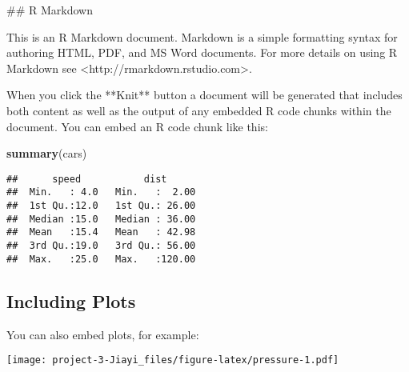 \documentclass[
]{article}
\newenvironment{Shaded}{\begin{snugshade}}{\end{snugshade}}
\newcommand{\FunctionTok}[1]{\textcolor[rgb]{0.13,0.29,0.53}{\textbf{#1}}}
\newcommand{\NormalTok}[1]{#1}
\begin{document}
\begin{Shaded}
\begin{Highlighting}[]
\NormalTok{\#\# R Markdown}

\NormalTok{This is an R Markdown document. Markdown is a simple formatting syntax for authoring HTML, PDF, and MS Word documents. For more details on using R Markdown see \textless{}http://rmarkdown.rstudio.com\textgreater{}.}

\NormalTok{When you click the **Knit** button a document will be generated that includes both content as well as the output of any embedded R code chunks within the document. You can embed an R code chunk like this:}
\end{Highlighting}
\end{Shaded}

\begin{Shaded}
\begin{Highlighting}[]
\FunctionTok{summary}\NormalTok{(cars)}
\end{Highlighting}
\end{Shaded}

\begin{verbatim}
##      speed           dist       
##  Min.   : 4.0   Min.   :  2.00  
##  1st Qu.:12.0   1st Qu.: 26.00  
##  Median :15.0   Median : 36.00  
##  Mean   :15.4   Mean   : 42.98  
##  3rd Qu.:19.0   3rd Qu.: 56.00  
##  Max.   :25.0   Max.   :120.00
\end{verbatim}

\subsection{Including Plots}\label{including-plots}

You can also embed plots, for example:

\texttt{[image: project-3-Jiayi\_files/figure-latex/pressure-1.pdf]}
\end{document}
